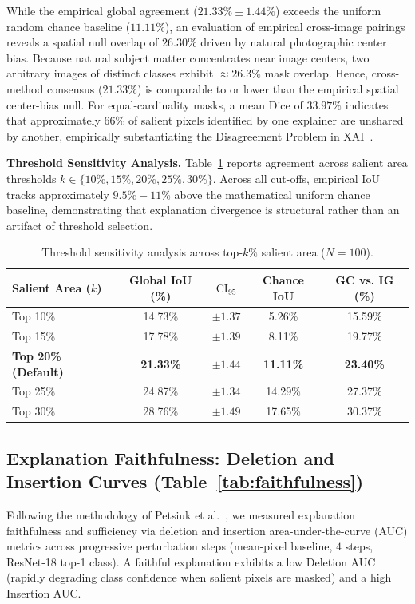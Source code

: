 \documentclass[journal,10pt,twocolumn]{IEEEtran}
\begin{document}
While the empirical global agreement ($21.33\% \pm 1.44\%$) exceeds the uniform random chance baseline ($11.11\%$), an evaluation of empirical cross-image pairings reveals a spatial null overlap of $26.30\%$ driven by natural photographic center bias. Because natural subject matter concentrates near image centers, two arbitrary images of distinct classes exhibit $\approx 26.3\%$ mask overlap. Hence, cross-method consensus ($21.33\%$) is comparable to or lower than the empirical spatial center-bias null. For equal-cardinality masks, a mean Dice of $33.97\%$ indicates that approximately $66\%$ of salient pixels identified by one explainer are unshared by another, empirically substantiating the Disagreement Problem in XAI~\cite{krishna2022disagreement}.

\noindent\textbf{Threshold Sensitivity Analysis.} Table~\ref{tab:sensitivity} reports agreement across salient area thresholds $k \in \{10\%, 15\%, 20\%, 25\%, 30\%\}$. Across all cut-offs, empirical IoU tracks approximately $9.5\% - 11\%$ above the mathematical uniform chance baseline, demonstrating that explanation divergence is structural rather than an artifact of threshold selection.

\begin{table}[t]
\centering
\caption{Threshold sensitivity analysis across top-$k\%$ salient area ($N=100$).}
\label{tab:sensitivity}
\begin{tabular}{lcccc}
\toprule
\textbf{Salient Area ($k$)} & \textbf{Global IoU (\%)} & \textbf{$\text{CI}_{95}$} & \textbf{Chance IoU} & \textbf{GC vs. IG (\%)} \\
\midrule
Top 10\% & 14.73\% & $\pm 1.37$ & 5.26\% & 15.59\% \\
Top 15\% & 17.78\% & $\pm 1.39$ & 8.11\% & 19.77\% \\
\textbf{Top 20\% (Default)} & \textbf{21.33\%} & $\mathbf{\pm 1.44}$ & \textbf{11.11\%} & \textbf{23.40\%} \\
Top 25\% & 24.87\% & $\pm 1.34$ & 14.29\% & 27.37\% \\
Top 30\% & 28.76\% & $\pm 1.49$ & 17.65\% & 30.37\% \\
\bottomrule
\end{tabular}
\end{table}

\subsection{Explanation Faithfulness: Deletion and Insertion Curves (Table~\ref{tab:faithfulness})}
Following the methodology of Petsiuk et al.~\cite{petsiuk2018rise}, we measured explanation faithfulness and sufficiency via deletion and insertion area-under-the-curve (AUC) metrics across progressive perturbation steps (mean-pixel baseline, $4$ steps, ResNet-18 top-1 class). A faithful explanation exhibits a low Deletion AUC (rapidly degrading class confidence when salient pixels are masked) and a high Insertion AUC. 
\end{document}
